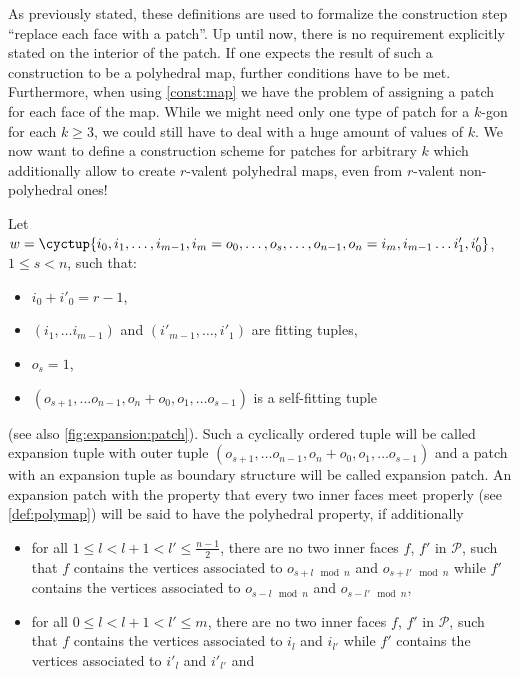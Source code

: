 \begin{construction}
\begin{cdescription}
  \end{cdescription}
\end{construction}

As previously stated, these definitions are used to formalize the construction step ``replace each face with a patch''. Up until now, there is no requirement explicitly stated on the interior of the patch. If one expects the result of such a construction to be a polyhedral map, further conditions have to be met. Furthermore, when using \autoref{const:map} we have the problem of assigning a patch for each face of the map. While we might need only one type of patch for a $k$-gon for each $k \geq 3$, we could still have to deal with a huge amount of values of $k$. We now want to define a construction scheme for patches for arbitrary $k$ which additionally allow to create $r$-valent polyhedral maps, even from $r$-valent non-polyhedral ones!

\begin{definition} Let $w = \cyctup{i_0, i_1, \dots, i_{m-1}, i_m = o_0, \dots, o_s, \dots, o_{n - 1}, o_n = i_m, i_{m-1} \dots i'_1, i'_0}$, $1 \leq s < n$, such that:
  \begin{itemize}
  \item $i_0 + i'_0 = r - 1$,
  \item $(i_1, \dots i_{m-1})$ and $(i'_{m-1}, \dots, i'_1)$ are fitting tuples,
  \item $o_s = 1$,
  \item $(o_{s + 1}, \dots o_{n - 1}, o_n + o_0, o_1, \dots o_{s - 1})$ is a self-fitting tuple
  \end{itemize}
  (see also \autoref{fig:expansion:patch}). Such a cyclically ordered tuple will be called expansion tuple with outer tuple $(o_{s + 1}, \dots o_{n - 1}, o_n + o_0, o_1, \dots o_{s - 1})$ and a patch with an expansion tuple as boundary structure will be called expansion patch. An expansion patch with the property that every two inner faces meet properly (see \autoref{def:polymap}) will be said to have the polyhedral property, if additionally 
  \begin{itemize}
  \item for all $1 \leq l < l + 1 < l' \leq \frac{n - 1}{2}$, there are no two inner faces $f$, $f'$ in $\mathcal{P}$, such that $f$ contains the vertices associated to $o_{s + l \mod n}$ and $o_{s + l' \mod n}$ while $f'$ contains the vertices associated to $o_{s - l \mod n}$ and $o_{s - l' \mod n}$,
  \item for all $0 \leq l < l + 1 < l' \leq m$, there are no two inner faces $f$, $f'$ in $\mathcal{P}$, such that $f$ contains the vertices associated to $i_{l}$ and $i_{l'}$ while $f'$ contains the vertices associated to $i'_{l}$ and $i'_{l'}$ and
  \end{itemize}
\end{definition}

